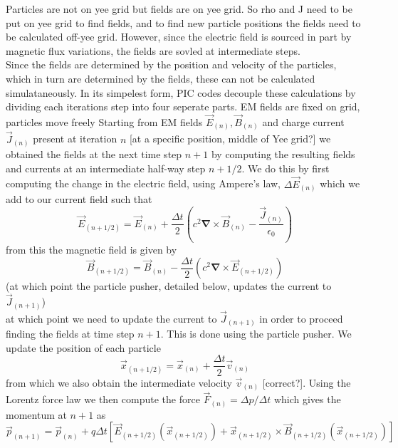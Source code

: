 \begin{itemize}
\clearpage 
Particles are not on yee grid but fields are on yee grid. So rho and J need to be put on yee grid to find fields, and to find new particle positions the fields need to be calculated off-yee grid. However, since the electric field is sourced in part by magnetic flux variations, the fields are sovled at intermediate steps.\\
Since the fields are determined by the position and velocity of the particles, which in turn are determined by the fields, these can not be calculated simulataneously. In its simpelest form, PIC codes decouple these calculations by dividing each iterations step into four seperate parts.  
EM fields are fixed on grid, particles move freely
\label{sec:Particle-in-Cell Codes}
Starting from EM fields $\vec{E}_{(n)},\vec{B}_{(n)}$ and charge current $\vec{J}_{(n)}$ present at iteration $n$ [at a specific position, middle of Yee grid?] we obtained the fields at the next time step $n+1$ by computing the resulting fields and currents at an intermediate half-way step $n+1/2$. We do this by first computing the change in the electric field, using Ampere's law, $\Delta \vec{E}_{(n)}$ which we add to our current field such that
\begin{equation}
\vec{E}_{(n+1/2)}=\vec{E}_{(n)}+\frac{\Delta t}{2}\left(c^2\mathbf{\nabla}\times \vec{B}_{(n)}-\frac{\vec{J}_{(n)}}{\epsilon_0}\right)
\end{equation}
from this the magnetic field is given by
\begin{equation}
\vec{B}_{(n+1/2)}=\vec{B}_{(n)}-\frac{\Delta t}{2}\left(c^2\mathbf{\nabla}\times \vec{E}_{(n+1/2)}\right)
\end{equation}
(at which point the particle pusher, detailed below, updates the current to $\vec{J}_{(n+1)}$)\\
at which point we need to update the current to $\vec{J}_{(n+1)}$ in order to proceed finding the fields at time step $n+1$. This is done using the particle pusher. We update the position of each particle 
\begin{equation}
\vec{x}_{(n+1/2)}=\vec{x}_{(n)}+\frac{\Delta t}{2}\vec{v}_{(n)}
\end{equation}
from which we also obtain the intermediate velocity $\vec{v}_{(n)}$ [correct?]. Using the Lorentz force law we then compute the force $\vec{F}_{(n)}=\Delta p/\Delta t$ which gives the momentum at $n+1$ as
\begin{equation}
\vec{p}_{(n+1)}=\vec{p}_{(n)}+q\Delta t\left[\vec{E}_{(n+1/2)}\left(\vec{x}_{(n+1/2)}\right)+\vec{x}_{(n+1/2)}\times\vec{B}_{(n+1/2)}\left(\vec{x}_{(n+1/2)}\right) \right]

\end{equation}
\end{itemize}
